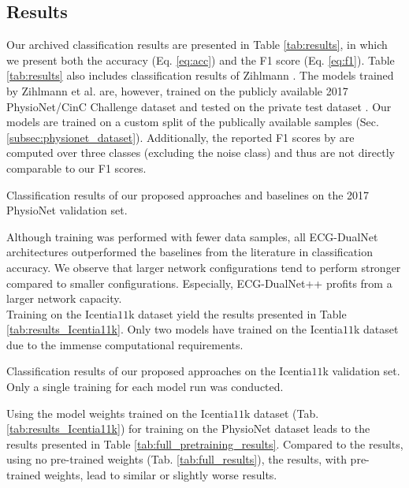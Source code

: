 \subsection{Results} \label{subsec:results}

Our archived classification results are presented in Table \ref{tab:results}, in which we present both the accuracy (Eq. \ref{eq:acc}) and the F1 score (Eq. \ref{eq:f1}). Table \ref{tab:results} also includes classification results of Zihlmann \etal \cite{Zihlmann2017}. The models trained by Zihlmann et al. are, however, trained on the publicly available 2017 PhysioNet/CinC Challenge dataset and tested on the private test dataset \cite{Zihlmann2017}. Our models are trained on a custom split of the publically available samples (Sec. \ref{subsec:physionet_dataset}). Additionally, the reported F1 scores by \cite{Zihlmann2017} are computed over three classes (excluding the noise class) and thus are not directly comparable to our F1 scores.

\begin{table}[!ht]
    \centering
    \caption{Classification results of our proposed approaches and baselines on the 2017 PhysioNet validation set.}
    
    \label{tab:results}
    \vspace{-0.5cm}
\end{table}

Although training was performed with fewer data samples, all ECG-DualNet architectures outperformed the baselines from the literature in classification accuracy. We observe that larger network configurations tend to perform stronger compared to smaller configurations. Especially, ECG-DualNet++ profits from a larger network capacity.\\
Training on the Icentia$11$k dataset \cite{Tan2019} yield the results presented in Table \ref{tab:results_Icentia11k}. Only two models have trained on the Icentia$11$k dataset due to the immense computational requirements.

\begin{table}[!ht]
    \centering
    \caption{Classification results of our proposed approaches on the Icentia$11$k validation set. Only a single training for each model run was conducted.}
    
    \label{tab:results_Icentia11k}
\end{table}

Using the model weights trained on the Icentia$11$k dataset (Tab. \ref{tab:results_Icentia11k}) for training on the PhysioNet dataset leads to the results presented in Table \ref{tab:full_pretraining_results}. Compared to the results, using no pre-trained weights (Tab. \ref{tab:full_results}), the results, with pre-trained weights, lead to similar or slightly worse results.

